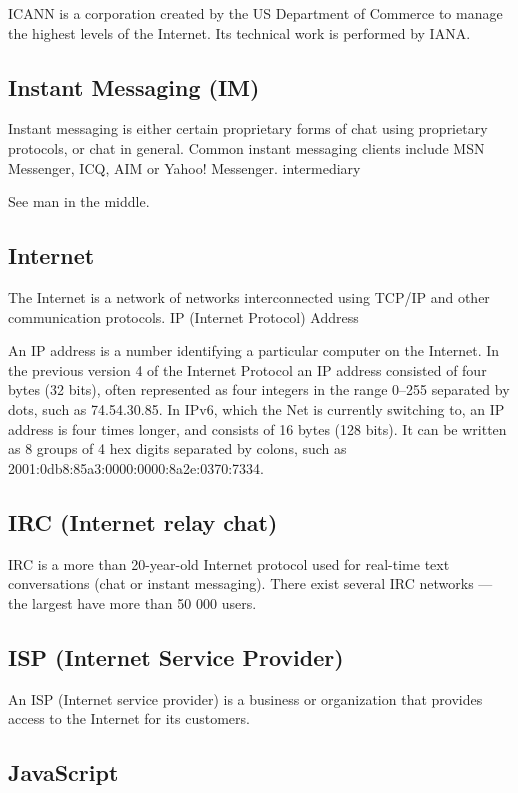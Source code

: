 ICANN is a corporation created by the US Department of Commerce to
manage the highest levels of the Internet. Its technical work is
performed by IANA.

\subsection{Instant Messaging (IM)}

Instant messaging is either certain proprietary forms of chat using
proprietary protocols, or chat in general. Common instant messaging
clients include MSN Messenger, ICQ, AIM or Yahoo! Messenger.
intermediary

See man in the middle.

\subsection{Internet}

The Internet is a network of networks interconnected using TCP/IP and
other communication protocols. IP (Internet Protocol) Address

An IP address is a number identifying a particular computer on the
Internet. In the previous version 4 of the Internet Protocol an IP
address consisted of four bytes (32 bits), often represented as four
integers in the range 0--255 separated by dots, such as 74.54.30.85. In
IPv6, which the Net is currently switching to, an IP address is four
times longer, and consists of 16 bytes (128 bits). It can be written as
8 groups of 4 hex digits separated by colons, such as
2001:0db8:85a3:0000:0000:8a2e:0370:7334.

\subsection{IRC (Internet relay chat)}

IRC is a more than 20-year-old Internet protocol used for real-time text
conversations (chat or instant messaging). There exist several IRC
networks --- the largest have more than 50 000 users.

\subsection{ISP (Internet Service Provider)}

An ISP (Internet service provider) is a business or organization that
provides access to the Internet for its customers.

\subsection{JavaScript}

